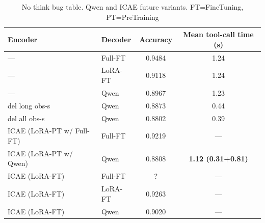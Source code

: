 \begin{table}[h]
    \centering
    \setlength{\tabcolsep}{6pt}
    \begin{tabular}{llcc}
        \toprule
        \textbf{Encoder} & \textbf{Decoder} & \textbf{Accuracy} & \textbf{Mean tool-call time (s)} \\
        \midrule
        —                        & Full-FT   & 0.9484 & 1.24 \\
        —                        & LoRA-FT   & 0.9118 & 1.24 \\
        —                        & Qwen           & 0.8967 & 1.23 \\
        \addlinespace
        del long obs-s             & Qwen           & 0.8873 & 0.44 \\
        del all obs-s              & Qwen           & 0.8802 & 0.39 \\
        \addlinespace
        ICAE (LoRA-PT w/ Full-FT)   & Full-FT   &  0.9219    &  — \\
        ICAE (LoRA-PT w/ Qwen)    & Qwen           &  0.8808 & \textbf{1.12 (0.31+0.81)} \\
        \addlinespace
        ICAE (LoRA-FT)         & Full-FT   &  ?   & —  \\
        ICAE (LoRA-FT)         & LoRA-FT   & 0.9263   & —  \\
        ICAE (LoRA-FT)         & Qwen           & 0.9020 & — \\

        
        \bottomrule
    \end{tabular}
    \caption{No think bug table. Qwen and ICAE future variants. FT=FineTuning, PT=PreTraining}
    \label{tab:icae_variants}
\end{table}

